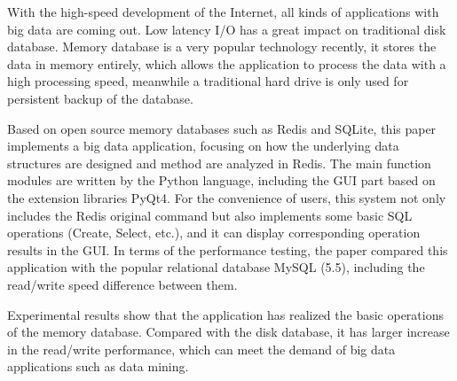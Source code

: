 \begin{abstracte}
With the high-speed development of the Internet, all kinds of applications with big data are coming out. Low latency I/O has a great impact on traditional disk database. Memory database is a very popular technology recently, it stores the data in memory entirely, which allows the application to process the data with a high processing speed, meanwhile a traditional hard drive is only used for persistent backup of the database.

Based on open source memory databases such as Redis and SQLite, this paper implements a big data application, focusing on how the underlying data structures are designed and method are analyzed in Redis. The main function modules are written by the Python language, including the GUI part based on the extension libraries PyQt4. For the convenience of users, this system not only includes the Redis original command but also implements some basic SQL operations (Create, Select, etc.), and it can display corresponding operation results in the GUI. In terms of the performance testing, the paper compared this application with the popular relational database MySQL (5.5), 
including the read/write speed difference between them.

Experimental results show that the application has realized the basic operations of the memory database. Compared with the disk database, it has larger increase in the read/write performance, which can meet the demand of big data applications such as data mining.

\end{abstracte}
